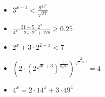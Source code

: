 \documentclass{article}
\begin{document}
\begin{itemize}
\item $\displaystyle 3^{x+1}<\frac{9^{4x^2}}{\sqrt{27}}$
\item $\displaystyle \frac{31-5\cdot2^x}{4^x-24\cdot2^x+128}\geq0.25$
\item $\displaystyle 2^x+3\cdot2^{2-x}<7$
\end{itemize}

\begin{itemize}
\item $\displaystyle \left(2\cdot \left( 2^{\sqrt{x}+3} \right)^{\frac{1}{2\sqrt{x}}}\right)^{\frac{2}{\sqrt{x}-1}}=4$
\item $\displaystyle 4^x=2\cdot14^x+3\cdot49^x$
\end{itemize}
\end{document}
